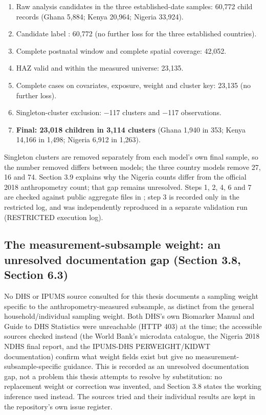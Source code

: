 \begin{enumerate}
\def\labelenumi{\arabic{enumi}.}
\tightlist
\item
  Raw analysis candidates in the three established-date samples: 60,772 child records (Ghana 5,884; Kenya 20,964; Nigeria 33,924).
\item
  Candidate label : 60,772 (no further loss for the three established countries).
\item
  Complete postnatal window and complete spatial coverage: 42,052.
\item
  HAZ valid and within the measured universe: 23,135.
\item
  Complete cases on covariates, exposure, weight and cluster key: 23,135 (no further loss).
\item
  Singleton-cluster exclusion: −117 clusters and −117 observations.
\item
  \textbf{Final: 23,018 children in 3,114 clusters} (Ghana 1,940 in 353; Kenya 14,166 in 1,498; Nigeria 6,912 in 1,263).
\end{enumerate}

Singleton clusters are removed separately from each model's own final sample, so the number removed differs between models; the three country models remove 27, 16 and 74. Section 3.9 explains why the Nigeria counts differ from the official 2018 anthropometry count; that gap remains unresolved. Steps 1, 2, 4, 6 and 7 are checked against public aggregate files in ; step 3 is recorded only in the restricted log, and was independently reproduced in a separate validation run (RESTRICTED execution log).

\subsection{The measurement-subsample weight: an unresolved documentation gap (Section 3.8, Section 6.3)}\label{sec:A.4}

No DHS or IPUMS source consulted for this thesis documents a sampling weight specific to the anthropometry-measured subsample, as distinct from the general household/individual sampling weight. Both DHS's own Biomarker Manual and Guide to DHS Statistics were unreachable (HTTP 403) at the time; the accessible sources checked instead (the World Bank's microdata catalogue, the Nigeria 2018 NDHS final report, and the IPUMS-DHS PERWEIGHT/KIDWT documentation) confirm what weight fields exist but give no measurement-subsample-specific guidance. This is recorded as an unresolved documentation gap, not a problem this thesis attempts to resolve by substitution: no replacement weight or correction was invented, and Section 3.8 states the working inference used instead. The sources tried and their individual results are kept in the repository's own issue register.

